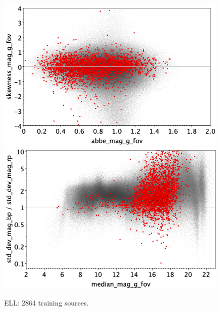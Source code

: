 \documentclass[longauth]{aa}
\begin{document}
\begin{appendix}
\begin{figure}
\vspace{4mm}
 \includegraphics[width=0.45\hsize]{figures/appendix/ELL_trn_ask.png}  %
\hspace{2mm}
 \includegraphics[width=0.45\hsize]{figures/appendix/ELL_trn_msdr.png}  \\ %
\vspace{4mm}
 \caption{ELL: 2864 training sources.}  
 \label{fig:app:ELL_trn}
\end{figure}


\end{appendix}
\end{document}
